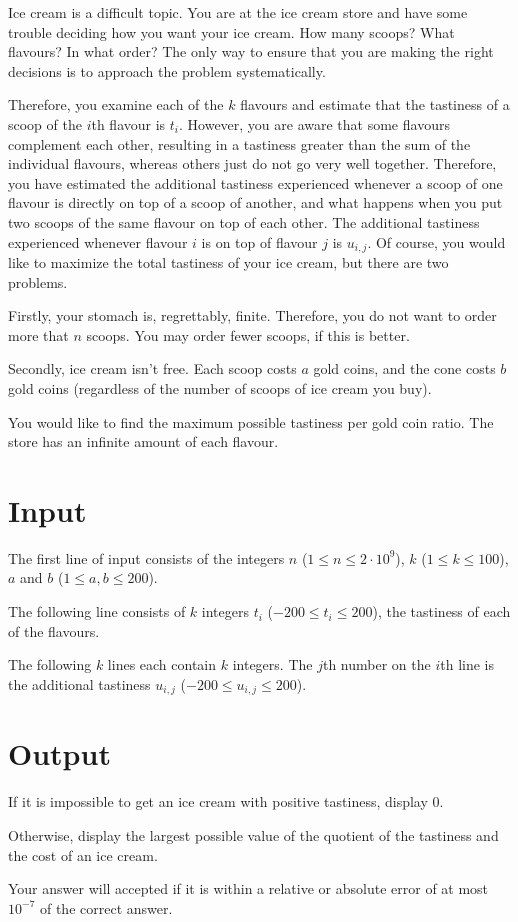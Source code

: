 Ice cream is a difficult topic. You are at the ice cream store and have some trouble deciding how you want your ice cream. How many scoops? What flavours? In what order? The only way to ensure that you are making the right decisions is to approach the problem systematically.

Therefore, you examine each of the $k$ flavours and estimate that the tastiness of a scoop of the $i$th flavour is $t_i$. However, you are aware that some flavours complement each other, resulting in a tastiness greater than the sum of the individual flavours, whereas others just do not go very well together. Therefore, you have estimated the additional tastiness experienced whenever a scoop of one flavour is directly on top of a scoop of another, and what happens when you put two scoops of the same flavour on top of each other. The additional tastiness experienced whenever flavour $i$ is on top of flavour $j$ is $u_{i,j}$.
Of course, you would like to maximize the total tastiness of your ice cream, but there are two problems.

Firstly, your stomach is, regrettably, finite. Therefore, you do not want to order more that $n$ scoops.
You may order fewer scoops, if this is better.

Secondly, ice cream isn't free. Each scoop costs $a$ gold coins, and the cone costs $b$ gold coins (regardless of the number of scoops of ice cream you buy).

You would like to find the maximum possible tastiness per gold coin ratio. The store has an infinite amount of each flavour.

\section*{Input}
The first line of input consists of the integers $n$ ($1 \leq n \leq 2 \cdot 10^9$), $k$ ($1 \leq k \leq 100$), $a$ and $b$ ($1 \leq a,b \leq 200$).

The following line consists of $k$ integers $t_i$ ($-200 \leq t_i \leq 200$), the tastiness of each of the flavours.

The following $k$ lines each contain $k$ integers. The $j$th number on the $i$th line is the additional tastiness $u_{i,j}$ ($-200 \leq u_{i,j} \leq 200$).

\section*{Output}
If it is impossible to get an ice cream with positive tastiness, display $0$.

Otherwise, display the largest possible value of the quotient of the tastiness and the cost of an ice cream.

Your answer will accepted if it is within a relative or absolute error of at most $10^{-7}$ of the correct answer.
